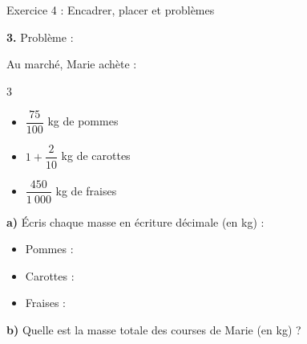 \begin{exercisebox}{ Exercice 4 : Encadrer, placer et problèmes }
	\exspace

	\textbf{3.} Problème : 

	\smallspace

	Au marché, Marie achète :
	\begin{multicols}{3}
	\begin{itemize}[label=$\bullet$,leftmargin=*,noitemsep]
		\item $\dfrac{75}{100}$ kg de pommes
		\item $1 + \dfrac{2}{10}$ kg de carottes
		\item $\dfrac{450}{1~000}$ kg de fraises
	\end{itemize}
	\end{multicols}

	\smallspace

	\textbf{a)} Écris chaque masse en écriture décimale (en kg) : 

	\smallspace

	\begin{itemize}[label=$\bullet$,leftmargin=*,noitemsep]
		\item Pommes : 
		\item Carottes : 
		\item Fraises : 
	\end{itemize}

	\smallspace

	\textbf{b)} Quelle est la masse totale des courses de Marie (en kg) ? 


\end{exercisebox}

\AutoEval
